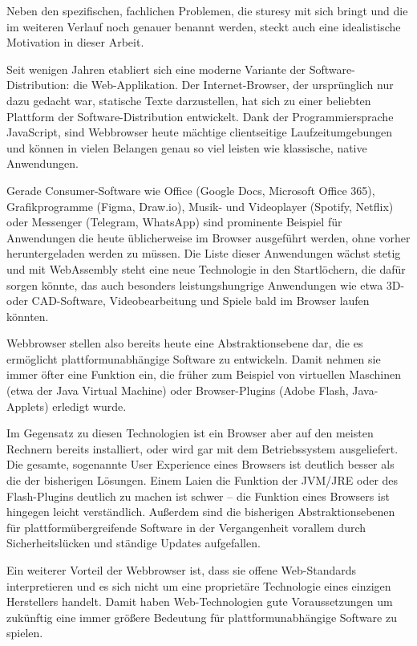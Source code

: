 Neben den spezifischen, fachlichen Problemen, die \ac{sturesy} mit sich bringt und die im weiteren Verlauf noch genauer benannt werden, steckt auch eine idealistische Motivation in dieser Arbeit.

Seit wenigen Jahren etabliert sich eine moderne Variante der Software-Distribution: die Web-Applikation. Der Internet-Browser, der ursprünglich nur dazu gedacht war, statische Texte darzustellen, hat sich zu einer beliebten Plattform der Software-Distribution entwickelt. Dank der Programmiersprache JavaScript, sind Webbrowser heute mächtige clientseitige Laufzeitumgebungen und können in vielen Belangen genau so viel leisten wie klassische, native Anwendungen.

Gerade Consumer-Software wie Office (Google Docs, Microsoft Office 365), Grafikprogramme (Figma, Draw.io), Musik- und Videoplayer (Spotify, Netflix) oder Messenger (Telegram, WhatsApp) sind prominente Beispiel für Anwendungen die heute üblicherweise im Browser ausgeführt werden, ohne vorher heruntergeladen werden zu müssen. Die Liste dieser Anwendungen wächst stetig und mit WebAssembly steht eine neue Technologie in den Startlöchern, die dafür sorgen könnte, das auch besonders leistungshungrige Anwendungen wie etwa 3D- oder CAD-Software, Videobearbeitung und Spiele bald im Browser laufen könnten.

Webbrowser stellen also bereits heute eine Abstraktionsebene dar, die es ermöglicht plattformunabhängige Software zu entwickeln. Damit nehmen sie immer öfter eine Funktion ein, die früher zum Beispiel von virtuellen Maschinen (etwa der Java Virtual Machine) oder Browser-Plugins (Adobe Flash, Java-Applets) erledigt wurde.

Im Gegensatz zu diesen Technologien ist ein Browser aber auf den meisten Rechnern bereits installiert, oder wird gar mit dem Betriebssystem ausgeliefert. Die gesamte, sogenannte User Experience eines Browsers ist deutlich besser als die der bisherigen Lösungen. Einem Laien die Funktion der JVM/JRE oder des Flash-Plugins deutlich zu machen ist schwer – die Funktion eines Browsers ist hingegen leicht verständlich. Außerdem sind die bisherigen Abstraktionsebenen für plattformübergreifende Software in der Vergangenheit vorallem durch Sicherheitslücken und ständige Updates aufgefallen.

Ein weiterer Vorteil der Webbrowser ist, dass sie offene Web-Standards interpretieren und es sich nicht um eine proprietäre Technologie eines einzigen Herstellers handelt. Damit haben Web-Technologien gute Voraussetzungen um zukünftig eine immer größere Bedeutung für plattformunabhängige Software zu spielen.

